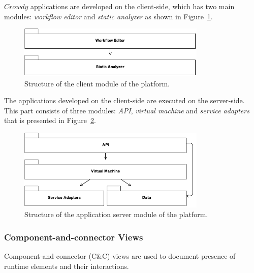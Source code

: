 $Crowdy$ applications are developed on the client-side, which has two main modules: 
\textit{workflow editor} and \textit{static analyzer} as shown in Figure~\ref{fig:clientarch}.

\begin{figure}[ht]
	\centering
	\includegraphics[width=0.8\textwidth]{figures/architecture/ClientDecomposition.pdf}
	\caption{Structure of the client module of the platform.}
	\label{fig:clientarch}
\end{figure}

The applications developed on the client-side are executed on the server-side. This 
part consists of three modules: \textit{API}, \textit{virtual machine} and 
\textit{service adapters} that is presented in Figure~\ref{fig:serverarch}.

\begin{figure}[ht]
	\centering
	\includegraphics[width=0.8\textwidth]{figures/architecture/ServerDecomposition.pdf}
	\caption{Structure of the application server module of the platform.}
	\label{fig:serverarch}
\end{figure}

\subsubsection{Component-and-connector Views}
Component-and-connector (C\&C) views are used to document 
presence of runtime elements and their interactions.

